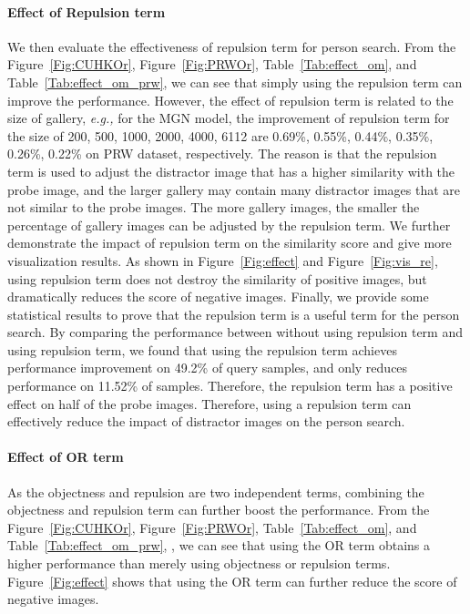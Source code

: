 \documentclass[journal]{IEEEtran}
\begin{document}
\paragraph{Effect of Repulsion term} We then evaluate the effectiveness of repulsion term for person search. 
From the Figure~\ref{Fig:CUHKOr}, Figure~\ref{Fig:PRWOr}, Table~\ref{Tab:effect_om}, and Table~\ref{Tab:effect_om_prw}, we can see that simply using the repulsion term can improve the performance. 
However, the effect of repulsion term is related to the size of gallery, \emph{e.g.,} for the MGN model, the improvement of repulsion term for the size of 200, 500, 1000, 2000, 4000, 6112 are 0.69\%, 0.55\%, 0.44\%, 0.35\%, 0.26\%, 0.22\% on PRW dataset, respectively. 
The reason is that the repulsion term is used to adjust the distractor image that has a higher similarity with the probe image, and the larger gallery may contain many distractor images that are not similar to the probe images. 
The more gallery images, the smaller the percentage of gallery images can be adjusted by the repulsion term. 
We further demonstrate the impact of repulsion term on the similarity score and give more visualization results. 
As shown in Figure~\ref{Fig:effect} and Figure~\ref{Fig:vis_re}, using repulsion term does not destroy the similarity of positive images, but dramatically reduces the score of negative images. 
Finally, we provide some statistical results to prove that the repulsion term is a useful term for the person search. 
By comparing the performance between without using repulsion term and using repulsion term, we found that using the repulsion term achieves performance improvement on 49.2\% of query samples, and only reduces performance on 11.52\% of samples.
Therefore, the repulsion term has a positive effect on half of the probe images.
Therefore, using a repulsion term can effectively reduce the impact of distractor images on the person search.

\paragraph{Effect of OR term} As the objectness and repulsion are two independent terms, combining the objectness  and repulsion term can further boost the performance. 
From the Figure~\ref{Fig:CUHKOr}, Figure~\ref{Fig:PRWOr}, Table~\ref{Tab:effect_om}, and Table~\ref{Tab:effect_om_prw}, , we can see  that using the OR term obtains a higher performance than merely using objectness or repulsion terms. 
Figure~\ref{Fig:effect} shows that using the OR term can further reduce the score of negative images.
\end{document}
